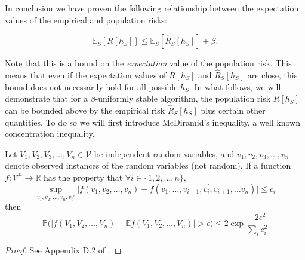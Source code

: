 \documentclass{article}
\begin{document}
In conclusion we have proven the following relationship between the expectation values of the empirical and population risks: 
\begin{prop}
\[
	\mathbb{E}_{S}[R[h_{S}]] \le \mathbb{E}_{S}[\hat{R}_{S}[h_S]] + \beta.
\]
\end{prop}








 








Note that this is a bound on the  \textit{expectation} value of the population risk. This means that even if the expectation values of $R[h_S]$ and $\hat{R}_S[h_S]$ are close, this bound does not necessarily hold for all possible $h_S$. 
In what follows, we will demonstrate that for a $\beta$-uniformly stable algorithm, the population risk  $R[h_S]$ can be bounded above by the empirical risk $\hat{R}_S[h_S]$ plus certain other quantities. To do so we will first introduce McDiramid's inequality, a well known concentration inequality.

\begin{thm}
Let $V_1, V_2, V_3, \dots , V_n \in \mathcal{V}$ be independent random variables, and $v_1, v_2,v_3,\dots,v_n$ denote observed instances of the random variables (not random). If a function $f: \mathcal{V}^n \to \mathbb{R}$ has the property that $\forall i \in \{1, 2, \dots, n\}$, 
\[
	\sup_{v_1, v_2, \dots, v_n, v_i{'}}{\biggl|f(v_1, v_2, \dots, v_n) - f(v_1, \dots,v_{i-1}, v_i^{'}, v_{i+1}, \dots v_n)\biggr|} \leq c_i
\]
then
\[
    \mathbb{P}\biggl(\bigl|f(V_1, V_2, \dots , V_n) - \mathbb{E}f(V_1, V_2, \dots , V_n)\bigr|>\epsilon\biggr) \leq 2 \exp{\frac{-2 \epsilon^2}{\sum_{i}{c_{i}^2}}}
\]
\end{thm}

\begin{proof}
See Appendix D.2 of \cite{mohri2012foundations}.
\end{proof}
\end{document}
